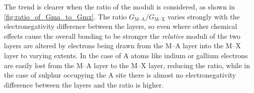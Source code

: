 The trend is clearer when the ratio of the moduli is considered, as shown in \autoref{fig:ratio_of_Gma_to_Gmx}. The ratio $G_{\text{M--A}}/G_{\text{M--X}}$ varies strongly with the electronegativity difference between the layers, so even where other chemical effects cause the overall bonding to be stronger the \emph{relative} moduli of the two layers are altered by electrons being drawn from the M--A layer into the M--X layer to varying extents. In the case of A atoms like indium or gallium electrons are easily lost from the M--A layer to the M--X layer, reducing the ratio, while in the case of sulphur occupying the A site there is almost no electronegativity difference between the layers and the ratio is higher.


\begin{figure}
\centering


\end{figure}
